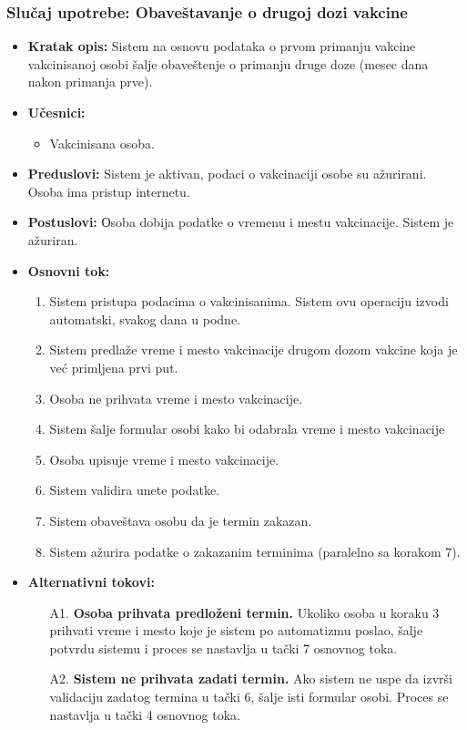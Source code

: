 \documentclass[titlepage]{article}
\begin{document}
\subsubsection{Slučaj upotrebe: Obave\v{s}tavanje o drugoj dozi vakcine}
\begin{itemize}
    \item \textbf{Kratak opis:} Sistem na osnovu podataka o prvom primanju vakcine vakcinisanoj osobi \v{s}alje obave\v{s}tenje o primanju druge doze (mesec dana nakon primanja prve).
    \item \textbf{Učesnici:} 
        \begin{itemize}
            \item Vakcinisana osoba.
        \end{itemize}
    \item \textbf{Preduslovi:} Sistem je aktivan, podaci o vakcinaciji osobe su a\v{z}urirani. Osoba ima pristup internetu.
    \item \textbf{Postuslovi:} Оsoba dobija podatke o vremenu i mestu vakcinacije. Sistem je a\v{z}uriran. 
    \item \textbf{Osnovni tok:}
    \begin{enumerate}
        \item Sistem pristupa podacima o vakcinisanima. Sistem ovu operaciju izvodi automatski, svakog dana u podne.
        \item Sistem predla\v{z}e vreme i mesto vakcinacije drugom dozom vakcine koja je već primljena prvi put.
        \item Osoba ne prihvata vreme i mesto vakcinacije.
        \item Sistem šalje formular osobi kako bi odabrala vreme i mesto vakcinacije
        \item Osoba upisuje vreme i mesto vakcinacije.
        \item Sistem validira unete podatke.
        \item Sistem obave\v{s}tava osobu da je termin zakazan.
        \item Sistem a\v{z}urira podatke o zakazanim terminima (paralelno sa korakom 7).
    \end{enumerate}
    \item \textbf{Alternativni tokovi:}
    \begin{itemize}
        \item[A1.] \textbf{Osoba prihvata predlo\v{z}eni termin.} Ukoliko osoba u koraku 3 prihvati vreme i mesto koje je sistem po automatizmu poslao, šalje potvrdu sistemu i proces se nastavlja u tački 7 osnovnog toka. 
        \item[A2.] \textbf{Sistem ne prihvata zadati termin.} Ako sistem ne uspe da izvrši validaciju zadatog termina u tački 6, \v{s}alje isti formular osobi. 
        Proces se nastavlja u tački 4 osnovnog toka.
        

\end{itemize}
\end{itemize}
\end{document}
